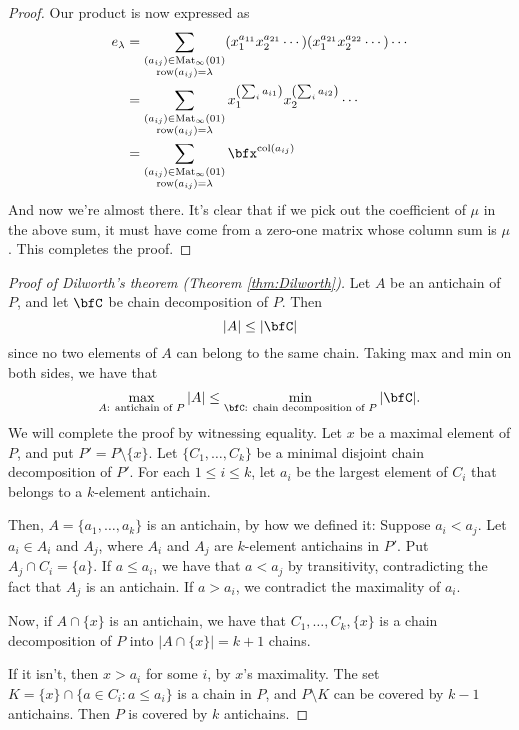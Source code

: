 \documentclass{article}
\DeclareMathOperator{\row}{row}
\DeclareMathOperator{\col}{col}
\DeclareMathOperator{\Mat}{Mat}
\begin{document}
\begin{proof}
    Our product is now expressed as
    \begin{align*}
        e_\lambda 
        &=
        \sum_{\substack{(a_{ij})\in\Mat_\infty(01)\\\row(a_{ij}) = \lambda}} (x_1^{a_{11}}x_2^{a_{21}}\cdots)(x_1^{a_{21}}x_2^{a_{22}}\cdots)\cdots \\
        &= 
        \sum_{\substack{(a_{ij})\in\Mat_\infty(01)\\\row(a_{ij}) = \lambda}} x_1^{\left(\sum_i a_{i1}\right)}x_2^{\left(\sum_i a_{i2}\right)} \cdots \\
        &= 
        \sum_{\substack{(a_{ij})\in\Mat_\infty(01)\\\row(a_{ij}) = \lambda}} \bfx^{\col(a_{ij})}
    \end{align*}
    And now we're almost there.
    It's clear that if we pick out the coefficient of $\mu$ in the above sum, it must have come from a zero-one matrix whose column sum is $\mu$.
    This completes the proof.
\end{proof}

\begin{proof}
    [Proof of Dilworth's theorem (Theorem \ref{thm:Dilworth})]
    \label{pf:Dilworth}
    Let $A$ be an antichain of $P$, and let $\bfC$ be chain decomposition of $P$.
    Then
    \[
        |A|
        \leq
        |\bfC|
    \]
    since no two elements of $A$ can belong to the same chain.
    Taking max and min on both sides, we have that
    \[
        \max_\text{$A$: antichain of $P$}
        |A|
        \leq
        \min_\text{$\bfC$: chain decomposition of $P$}
        |\bfC|
        .
    \]
    We will complete the proof by witnessing equality.
    Let $x$ be a maximal element of $P$, and put $P' = P \setminus \{x\}$.
    Let $\{C_1, \ldots, C_k\}$ be a minimal disjoint chain decomposition of $P'$.
    For each $1 \leq i \leq k$, let $a_i$ be the largest element of $C_i$ that belongs to a $k$-element antichain.

    Then, $A = \{a_1,\ldots,a_k\}$ is an antichain, by how we defined it:
    Suppose $a_i < a_j$.
    Let $a_i \in A_i$ and $A_j$, where $A_i$ and $A_j$ are $k$-element antichains in $P'$.
    Put $A_j \cap C_i = \{a\}$.
    If $a \leq a_i$, we have that $a < a_j$ by transitivity, contradicting the fact that $A_j$ is an antichain.
    If $a > a_i$, we contradict the maximality of $a_i$.

    Now, if $A \cap \{x\}$ is an antichain, we have that $C_1,\ldots,C_k,\{x\}$ is a chain decomposition of $P$ into $|A \cap \{x\}| = k+1$ chains.

    If it isn't, then $x > a_i$ for some $i$, by $x$'s maximality.
    The set $K = \{x\} \cap \{a \in C_i : a \leq a_i\}$ is a chain in $P$, and $P \setminus K$ can be covered by $k-1$ antichains.
    Then $P$ is covered by $k$ antichains.
\end{proof}
\end{document}
